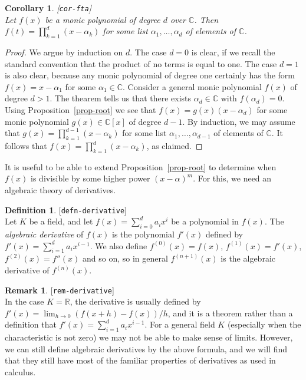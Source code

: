 \documentclass{amsart}
\newcommand{\lbl}[1]{\label{#1}\textup{[\texttt{#1}]}\ \\}
\newcommand{\lbl}{\label}
\newcommand{\R}         {{\mathbb{R}}}
\newcommand{\C}         {{\mathbb{C}}}
\newcommand{\al}        {\alpha}
\renewcommand{\:}{\colon}
\newtheorem{corollary}[theorem]{Corollary}
\theoremstyle{definition}
\newtheorem{remark}[theorem]{Remark}
\newtheorem{definition}[theorem]{Definition}
\begin{document}
\begin{corollary}\lbl{cor-fta}
 Let $f(x)$ be a monic polynomial of degree $d$ over $\C$.  Then
 $f(t)=\prod_{k=1}^d(x-\al_k)$ for some list $\al_1,\dotsc,\al_d$ of
 elements of $\C$.
\end{corollary}
\begin{proof}
 We argue by induction on $d$.  The case $d=0$ is clear, if we recall
 the standard convention that the product of no terms is equal to
 one.  The case $d=1$ is also clear, because any monic polynomial of
 degree one certainly has the form $f(x)=x-\al_1$ for some
 $\al_1\in\C$.  Consider a general monic polynomial $f(x)$ of degree
 $d>1$.  The thearem tells us that there exists $\al_d\in\C$ with
 $f(\al_d)=0$.  Using Proposition~\ref{prop-root} we see that
 $f(x)=g(x)(x-\al_d)$ for some monic polynomial $g(x)\in\C[x]$ of
 degree $d-1$.  By induction, we may assume that
 $g(x)=\prod_{k=1}^{d-1}(x-\al_k)$ for some list
 $\al_1,\dotsc,\al_{d-1}$ of elements of $\C$.  It follows that
 $f(x)=\prod_{k=1}^{d}(x-\al_k)$, as claimed. 
\end{proof}

It is useful to be able to extend Proposition~\ref{prop-root} to
determine when $f(x)$ is divisible by some higher power $(x-\al)^m$.
For this, we need an algebraic theory of derivatives.

\begin{definition}\lbl{defn-derivative}
 Let $K$ be a field, and let $f(x)=\sum_{i=0}^da_ix^i$ be a polynomial
 in $f(x)$.  The \emph{algebraic derivative} of $f(x)$ is the
 polynomial $f'(x)$ defined by $f'(x)=\sum_{i=1}^da_ix^{i-1}$.  We
 also define $f^{(0)}(x)=f(x)$, $f^{(1)}(x)=f'(x)$,
 $f^{(2)}(x)=f''(x)$ and so on, so in general $f^{(n+1)}(x)$ is the
 algebraic derivative of $f^{(n)}(x)$.
\end{definition}

\begin{remark}\lbl{rem-derivative}
 In the case $K=\R$, the derivative is usually defined by
 $f'(x)=\lim_{h\to 0}(f(x+h)-f(x))/h$, and it is a theorem rather than
 a definition that $f'(x)=\sum_{i=1}^da_ix^{i-1}$.  For a general
 field $K$ (especially when the characteristic is not zero) we may not
 be able to make sense of limits.  However, we can still define
 algebraic derivatives by the above formula, and we will find that
 they still have most of the familiar properties of derivatives as
 used in calculus.
\end{remark}
\end{document}
